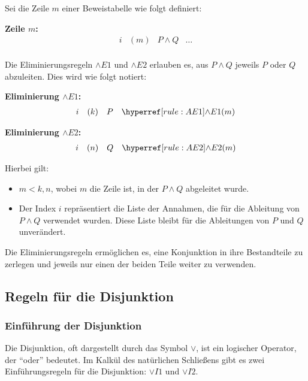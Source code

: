 \documentclass[main.tex]{subfiles}
\begin{document}
\begin{definition}
Sei die Zeile \(m\) einer Beweistabelle wie folgt definiert:

\textbf{Zeile \(m\):}
\[
\begin{array}{llll}
    i & (m) & P \land Q & \dots \\
\end{array}
\]

Die Eliminierungsregeln \(\land E1\) und \(\land E2\) erlauben es, aus \(P \land Q\) jeweils \(P\) oder \(Q\) abzuleiten. Dies wird wie folgt notiert:

\textbf{Eliminierung \(\land E1\):}
\[
\begin{array}{llll}
    i & (k) & P & \rAEa{m} \\
\end{array}
\]

\textbf{Eliminierung \(\land E2\):}
\[
\begin{array}{llll}
    i & (n) & Q & \rAEb{m} \\
\end{array}
\]

Hierbei gilt:
\begin{itemize}
    \item \(m < k, n\), wobei \(m\) die Zeile ist, in der \(P \land Q\) abgeleitet wurde.
    \item Der Index \(i\) repräsentiert die Liste der Annahmen, die für die Ableitung von \(P \land Q\) verwendet wurden. Diese Liste bleibt für die Ableitungen von \(P\) und \(Q\) unverändert.
\end{itemize}

Die Eliminierungsregeln ermöglichen es, eine Konjunktion in ihre Bestandteile zu zerlegen und jeweils nur einen der beiden Teile weiter zu verwenden.
\end{definition}

\subsection{Regeln für die Disjunktion}

\subsubsection{Einführung der Disjunktion}
\label{rule:OI1}\label{rule:OI2}
Die Disjunktion, oft dargestellt durch das Symbol \(\lor\), ist ein logischer Operator, der \enquote{oder} bedeutet. Im Kalkül des natürlichen Schließens gibt es zwei Einführungsregeln für die Disjunktion: \(\lor I1\) und \(\lor I2\).
\end{document}
